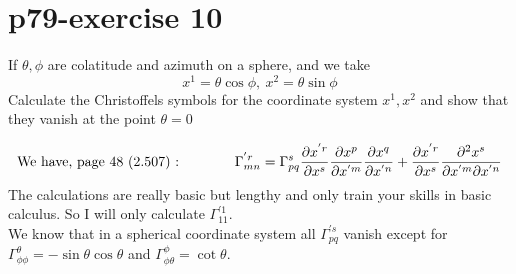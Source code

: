 \section{p79-exercise 10}
\begin{tcolorbox}
If $\theta, \phi$ are colatitude and azimuth on a sphere, and we take
$$x^1 = \theta \cos \phi, \ x^2=\theta\sin \phi$$
Calculate the Christoffels symbols for the coordinate system $x^1, x^2$ and show that they vanish at the point $\theta = 0$
\end{tcolorbox}
\begin{align}
\text{We have, page 48  (2.507) :}\quad\quad\quad\quad\Gamma_{mn}^{'r} =\Gamma_{pq}^{s}\pdv{x^{'r}}{x^s}\pdv{x^{p}}{x^{'m}}\pdv{x^{q}}{x^{'n}}+\pdv{x^{'r}}{x^s}\pdv{x^s}{x^{'m}}{x^{'n}}
\end{align}
The calculations are really basic but lengthy and only train your skills in basic calculus. So I will only calculate $\Gamma_{11}^{'1}$.\\
We know that in a spherical coordinate system all $\Gamma_{pq}^{'s}$ vanish except for $\Gamma_{\phi\phi}^{\theta} = -\sin\theta\cos\theta$ and $
\Gamma_{\phi\theta}^{\phi} =  \cot\theta$.
